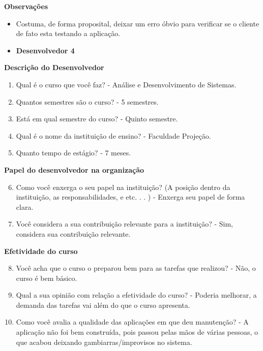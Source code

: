 \begin{anexosenv}
\textbf{Observações}
\begin{itemize}
\item Costuma, de forma proposital, deixar um erro óbvio para verificar se o cliente de fato esta testando a aplicação.
\end{itemize}


\begin{itemize}
\item \textbf{Desenvolvedor 4}
\end{itemize}

\textbf{Descrição do Desenvolvedor}

\begin{enumerate}
\item Qual é o curso que você faz?\newline
- Análise e Desenvolvimento de Sistemas.
\item Quantos semestres são o curso?\newline
- 5 semestres.
\item Está em qual semestre do curso?\newline
- Quinto semestre.
\item Qual é o nome da instituição de ensino?\newline
- Faculdade Projeção.
\item Quanto tempo de estágio?\newline
- 7 meses.
\end{enumerate}

\textbf{Papel do desenvolvedor na organização}

\begin{enumerate}
\setcounter{enumi}{5}
\item Como você enxerga o seu papel na instituição? (A posição dentro da instituição, as
responsabilidades, e etc. . . )\newline
- Enxerga seu papel de forma clara.
\item Você considera a sua contribuição relevante para a instituição?\newline
- Sim, considera sua contribuição relevante.
\end{enumerate}

\textbf{Efetividade do curso}

\begin{enumerate}
\setcounter{enumi}{7}
\item Você acha que o curso o preparou bem para as tarefas que realizou?\newline
- Não, o curso é bem básico.
\item Qual a sua opinião com relação a efetividade do curso?\newline
- Poderia melhorar, a demanda das tarefas vai além do que o curso apresenta.
\item Como você avalia a qualidade das aplicações em que deu manutenção?\newline
- A aplicação não foi bem construída, pois passou pelas mãos de várias pessoas, o que acabou deixando gambiarras/improvisos no sistema.
\end{enumerate}


\end{anexosenv}

